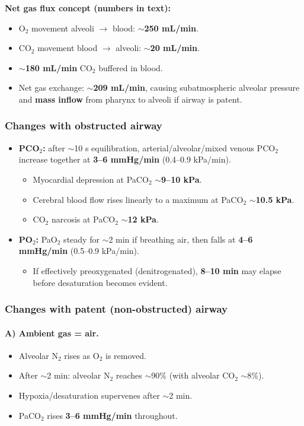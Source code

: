 \documentclass[11pt,a4paper]{article}
\begin{document}
\textbf{Net gas flux concept (numbers in text):}
\begin{itemize}
  \item O$_2$ movement alveoli $\rightarrow$ blood: $\sim$\textbf{250 mL/min}.
  \item CO$_2$ movement blood $\rightarrow$ alveoli: $\sim$\textbf{20 mL/min}.
  \item $\sim$\textbf{180 mL/min} CO$_2$ buffered in blood.
  \item Net gas exchange: \textbf{$\sim$209 mL/min}, causing subatmospheric alveolar pressure and \textbf{mass inflow} from pharynx to alveoli if airway is patent.
\end{itemize}

\subsubsection{Changes with obstructed airway}
\begin{itemize}
  \item \textbf{PCO$_2$:} after $\sim$10 s equilibration, arterial/alveolar/mixed venous PCO$_2$ increase together at \textbf{3--6 mmHg/min} (0.4--0.9 kPa/min).
  \begin{itemize}
    \item Myocardial depression at PaCO$_2$ $\sim$\textbf{9--10 kPa}.
    \item Cerebral blood flow rises linearly to a maximum at PaCO$_2$ $\sim$\textbf{10.5 kPa}.
    \item CO$_2$ narcosis at PaCO$_2$ $\sim$\textbf{12 kPa}.
  \end{itemize}
  \item \textbf{PO$_2$:} PaO$_2$ steady for $\sim$2 min if breathing air, then falls at \textbf{4--6 mmHg/min} (0.5--0.9 kPa/min).
  \begin{itemize}
    \item If effectively preoxygenated (denitrogenated), \textbf{8--10 min} may elapse before desaturation becomes evident.
  \end{itemize}
\end{itemize}

\subsubsection{Changes with patent (non-obstructed) airway}

\paragraph{A) Ambient gas = air.}
\begin{itemize}
  \item Alveolar N$_2$ rises as O$_2$ is removed.
  \item After $\sim$2 min: alveolar N$_2$ reaches $\sim$90\% (with alveolar CO$_2$ $\sim$8\%).
  \item Hypoxia/desaturation supervenes after $\sim$2 min.
  \item PaCO$_2$ rises \textbf{3--6 mmHg/min} throughout.
\end{itemize}
\end{document}
